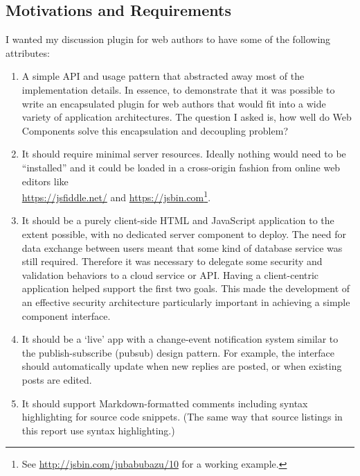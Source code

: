 \subsection{Motivations and Requirements}
\label{motivations}
I wanted my discussion plugin for web authors to have some of the following attributes:
\begin{enumerate}
\item A simple API and usage pattern that abstracted away most of the implementation details. In essence, to demonstrate that it was possible to write an encapsulated plugin for web authors that would fit into a wide variety of application architectures. The question I asked is, how well do Web Components solve this encapsulation and decoupling problem?\label{motive:abstraction}

\item It should require minimal server resources. Ideally nothing would need to be ``installed'' and it could be loaded in a cross-origin fashion from online web editors like \\ \url{https://jsfiddle.net/} and \url{https://jsbin.com}\footnote{See \url{http://jsbin.com/jubabubazu/10} for a working example.}.
\label{motive:cors}

\item It should be a purely client-side HTML and JavaScript application to the extent possible, 
with no dedicated server component to deploy. 
The need for data exchange between users meant that some kind of database service was still required. 
Therefore it was necessary to delegate some security and validation behaviors to a cloud service or API. 
Having a client-centric application helped support the first two goals. 
This made the development of an effective security architecture particularly important in achieving a simple component interface.

\item It should be a `live' app with a change-event notification system similar to the
publish-subscribe (pubsub) design pattern.\label{motive:pubsub} 
For example, the interface should automatically update when new replies are posted,
or when existing posts are edited.

\item It should support Markdown-formatted comments including syntax highlighting for source code snippets. (The same way that source listings in this report use syntax highlighting.)\label{motive:markdown}


\end{enumerate}
